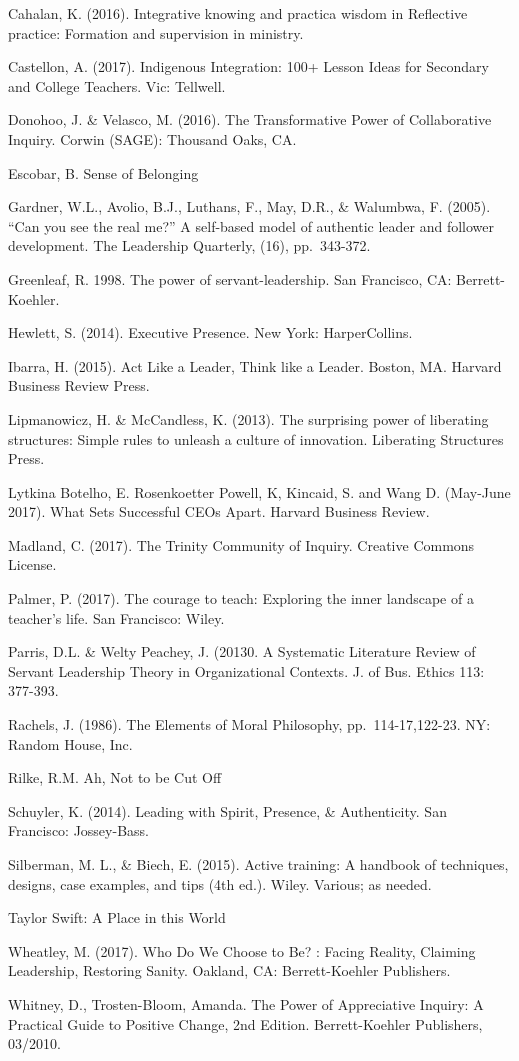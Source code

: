 \documentclass[
]{book}
\begin{document}
Cahalan, K. (2016). Integrative knowing and practica wisdom in Reflective practice: Formation and supervision in ministry.

Castellon, A. (2017). Indigenous Integration: 100+ Lesson Ideas for Secondary and College Teachers. Vic: Tellwell.

Donohoo, J. \& Velasco, M. (2016). The Transformative Power of Collaborative Inquiry. Corwin (SAGE): Thousand Oaks, CA.

Escobar, B. Sense of Belonging

Gardner, W.L., Avolio, B.J., Luthans, F., May, D.R., \& Walumbwa, F. (2005). ``Can you see the real me?'' A self-based model of authentic leader and follower development. The Leadership Quarterly, (16), pp.~343-372.

Greenleaf, R. 1998. The power of servant-leadership. San Francisco, CA: Berrett-Koehler.

Hewlett, S. (2014). Executive Presence. New York: HarperCollins.

Ibarra, H. (2015). Act Like a Leader, Think like a Leader. Boston, MA. Harvard Business Review Press.

Lipmanowicz, H. \& McCandless, K. (2013). The surprising power of liberating structures: Simple rules to unleash a culture of innovation. Liberating Structures Press.

Lytkina Botelho, E. Rosenkoetter Powell, K, Kincaid, S. and Wang D. (May-June 2017). What Sets Successful CEOs Apart. Harvard Business Review.

Madland, C. (2017). The Trinity Community of Inquiry. Creative Commons License.

Palmer, P. (2017). The courage to teach: Exploring the inner landscape of a teacher's life. San Francisco: Wiley.

Parris, D.L. \& Welty Peachey, J. (20130. A Systematic Literature Review of Servant Leadership Theory in Organizational Contexts. J. of Bus. Ethics 113: 377-393.

Rachels, J. (1986). The Elements of Moral Philosophy, pp.~114-17,122-23. NY: Random House, Inc.

Rilke, R.M. Ah, Not to be Cut Off

Schuyler, K. (2014). Leading with Spirit, Presence, \& Authenticity. San Francisco: Jossey-Bass.

Silberman, M. L., \& Biech, E. (2015). Active training: A handbook of techniques, designs, case examples, and tips (4th ed.). Wiley. Various; as needed.

Taylor Swift: A Place in this World

Wheatley, M. (2017). Who Do We Choose to Be? : Facing Reality, Claiming Leadership, Restoring Sanity. Oakland, CA: Berrett-Koehler Publishers.

Whitney, D., Trosten-Bloom, Amanda. The Power of Appreciative Inquiry: A Practical Guide to Positive Change, 2nd Edition. Berrett-Koehler Publishers, 03/2010.

  
\end{document}

